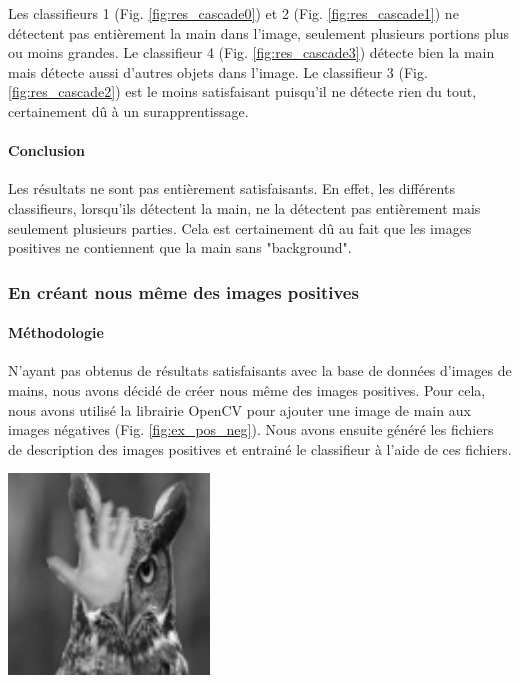 \documentclass[11pt]{article}
\begin{document}
\bigbreak

Les classifieurs 1 (Fig. \ref{fig:res_cascade0}) et 2 (Fig. \ref{fig:res_cascade1}) ne détectent pas entièrement la main dans l'image, seulement plusieurs portions plus ou moins grandes. Le classifieur 4 (Fig. \ref{fig:res_cascade3}) détecte bien la main mais détecte aussi d'autres objets dans l'image. Le classifieur 3 (Fig. \ref{fig:res_cascade2}) est le moins satisfaisant puisqu'il ne détecte rien du tout, certainement dû à un surapprentissage.

\paragraph{Conclusion}
Les résultats ne sont pas entièrement satisfaisants. En effet, les différents classifieurs, lorsqu'ils détectent la main, ne la détectent pas entièrement mais seulement plusieurs parties. Cela est certainement dû au fait que les images positives ne contiennent que la main sans "background". 

\subsubsection{En créant nous même des images positives}
\paragraph{Méthodologie}
N'ayant pas obtenus de résultats satisfaisants avec la base de données d'images de mains, nous avons décidé de créer nous même des images positives. Pour cela, nous avons utilisé la librairie OpenCV pour ajouter une image de main aux images négatives (Fig. \ref{fig:ex_pos_neg}). Nous avons ensuite généré les fichiers de description des images positives et entrainé le classifieur à l'aide de ces fichiers. \bigbreak

\begin{center}
    \includegraphics[width=0.4\textwidth]{images/ex_pos_neg.jpg}
    \label{fig:ex_pos_neg}
\end{center}
\end{document}
